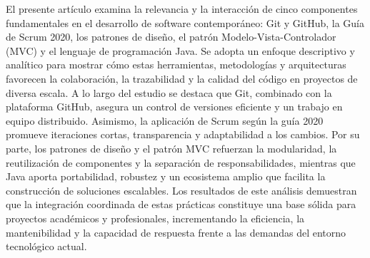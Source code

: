 El presente artículo examina la relevancia y la interacción de cinco componentes fundamentales en el desarrollo de software contemporáneo: Git y GitHub, la Guía de Scrum 2020, los patrones de diseño, el patrón Modelo-Vista-Controlador (MVC) y el lenguaje de programación Java. Se adopta un enfoque descriptivo y analítico para mostrar cómo estas herramientas, metodologías y arquitecturas favorecen la colaboración, la trazabilidad y la calidad del código en proyectos de diversa escala. A lo largo del estudio se destaca que Git, combinado con la plataforma GitHub, asegura un control de versiones eficiente y un trabajo en equipo distribuido. Asimismo, la aplicación de Scrum según la guía 2020 promueve iteraciones cortas, transparencia y adaptabilidad a los cambios. Por su parte, los patrones de diseño y el patrón MVC refuerzan la modularidad, la reutilización de componentes y la separación de responsabilidades, mientras que Java aporta portabilidad, robustez y un ecosistema amplio que facilita la construcción de soluciones escalables. Los resultados de este análisis demuestran que la integración coordinada de estas prácticas constituye una base sólida para proyectos académicos y profesionales, incrementando la eficiencia, la mantenibilidad y la capacidad de respuesta frente a las demandas del entorno tecnológico actual.